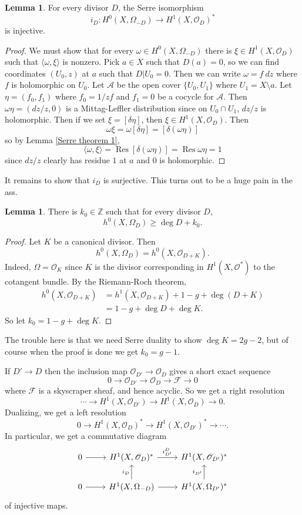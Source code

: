 \documentclass[12pt]{book}
\newcommand{\ZZ}{\mathbb{Z}}
\newcommand{\Olo}{\mathscr O}
\DeclareMathOperator{\Res}{Res}
\theoremstyle{definition}
\newtheorem{lemma}[theorem]{Lemma}
\begin{document}
\begin{lemma}
\label{Serre theorem 2}
For every divisor $D$, the Serre isomorphism
$$i_D: H^0(X, \Omega_{-D}) \to H^1(X, \Olo_D)^*$$
is injective.
\end{lemma}
\begin{proof}
We must show that for every $\omega \in H^0(X, \Omega_{-D})$ there is $\xi \in H^1(X, \Olo_D)$ such that $\langle \omega, \xi\rangle$ is nonzero.
Pick $a \in X$ such that $D(a) = 0$, so we can find coordinates $(U_0, z)$ at $a$ such that $D|U_0 = 0$.
Then we can write $\omega = f~dz$ where $f$ is holomorphic on $U_0$.
Let $\mathscr A$ be the open cover $\{U_0, U_1\}$ where $U_1 = X \setminus a$.
Let $\eta = (f_0, f_1)$ where $f_0 = 1/zf$ and $f_1 = 0$ be a cocycle for $\mathscr A$.
Then $\omega\eta = (dz/z, 0)$ is a Mittag-Leffler distribution since on $U_0 \cap U_1$, $dz/z$ is holomorphic.
Then if we set $\xi = [\delta \eta]$, then $\xi \in H^1(X, \Olo_D)$.
Then
$$\omega\xi = \omega[\delta \eta] = [\delta(\omega \eta)]$$
so by Lemma \ref{Serre theorem 1},
$$\langle \omega, \xi\rangle = \Res [\delta(\omega \eta)] = \Res \omega\eta = 1$$
since $dz/z$ clearly has residue $1$ at $a$ and $0$ is holomorphic.
\end{proof}

It remains to show that $i_D$ is surjective. This turns out to be a huge pain in the ass.

\begin{lemma}
\label{Serre theorem 3}
There is $k_0 \in \ZZ$ such that for every divisor $D$,
$$h^0(X, \Omega_D) \geq \deg D + k_0.$$
\end{lemma}
\begin{proof}
Let $K$ be a canonical divisor. Then
$$h^0(X, \Omega_D) = h^0(X, \Olo_{D + K}).$$
Indeed, $\Omega = \Olo_K$ since $K$ is the divisor corresponding in $H^1(X, \Olo^*)$ to the cotangent bundle.
By the Riemann-Roch theorem,
\begin{align*}
h^0(X, \Olo_{D + K}) &= h^1(X, \Olo_{D+K}) + 1 - g + \deg(D + K)\\
&= 1 - g + \deg D + \deg K.
\end{align*}
So let $k_0 = 1 - g + \deg K$.
\end{proof}

The trouble here is that we need Serre duality to show $\deg K = 2g - 2$, but of course when the proof is done we get $k_0 = g - 1$.

If $D' \to D$ then the inclusion map $\Olo_{D'} \to \Olo_D$ gives a short exact sequence
$$0 \to \Olo_{D'} \to \Olo_D \to \mathscr F \to 0$$
where $\mathscr F$ is a skyscraper sheaf, and hence acyclic. So we get a right resolution
$$\cdots \to H^1(X, \Olo_{D'}) \to H^1(X, \Olo_D) \to 0.$$
Dualizing, we get a left resolution
$$0 \to H^1(X, \Olo_D)^* \to H^1(X, \Olo_{D'})^* \to \cdots.$$
In particular, we get a commutative diagram
$$\begin{tikzcd}
0 \arrow[r] & H^1(X, \Olo_D)^* \arrow[r,"i_{D'}^D"] & H^1(X, \Olo_{D'})^*\\
0 \arrow[r] & H^1(X, \Omega_{-D}) \arrow[u,"i_D"] \arrow[r] & H^1(X, \Omega_{D'})^* \arrow[u,"i_{D'}"]
\end{tikzcd}
$$
of injective maps.
\end{document}
